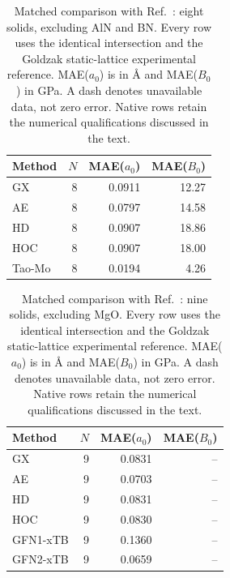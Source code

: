 \begin{table}[t]
\centering
\small
\caption{Matched comparison with Ref.~: eight solids, excluding AlN and BN. Every row uses the identical intersection and the Goldzak static-lattice experimental reference. MAE($a_0$) is in \AA{} and MAE($B_0$) in GPa. A dash denotes unavailable data, not zero error. Native rows retain the numerical qualifications discussed in the text.}
\label{tab:literature-Mo2017}
\begin{tabular}{lrrr}
\toprule
Method & $N$ & MAE($a_0$) & MAE($B_0$) \\
\midrule
GX & 8 & 0.0911 & 12.27 \\
AE & 8 & 0.0797 & 14.58 \\
HD & 8 & 0.0907 & 18.86 \\
HOC & 8 & 0.0907 & 18.00 \\
Tao-Mo & 8 & 0.0194 & 4.26 \\
\bottomrule
\end{tabular}
\end{table}

\begin{table}[t]
\centering
\small
\caption{Matched comparison with Ref.~: nine solids, excluding MgO. Every row uses the identical intersection and the Goldzak static-lattice experimental reference. MAE($a_0$) is in \AA{} and MAE($B_0$) in GPa. A dash denotes unavailable data, not zero error. Native rows retain the numerical qualifications discussed in the text.}
\label{tab:literature-PeriodicGFN2Manuscript}
\begin{tabular}{lrrr}
\toprule
Method & $N$ & MAE($a_0$) & MAE($B_0$) \\
\midrule
GX & 9 & 0.0831 & -- \\
AE & 9 & 0.0703 & -- \\
HD & 9 & 0.0831 & -- \\
HOC & 9 & 0.0830 & -- \\
GFN1-xTB & 9 & 0.1360 & -- \\
GFN2-xTB & 9 & 0.0659 & -- \\
\bottomrule
\end{tabular}
\end{table}

